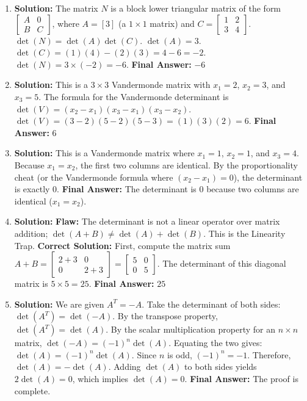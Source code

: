 \documentclass[11pt]{article}
\begin{document}
\begin{enumerate}
    \item \textbf{Solution:} The matrix $N$ is a block lower triangular matrix of the form $\begin{bmatrix} A & 0 \\ B & C \end{bmatrix}$, where $A = [3]$ (a $1 \times 1$ matrix) and $C = \begin{bmatrix} 1 & 2 \\ 3 & 4 \end{bmatrix}$.
    $\det(N) = \det(A)\det(C)$.
    $\det(A) = 3$.
    $\det(C) = (1)(4) - (2)(3) = 4 - 6 = -2$.
    $\det(N) = 3 \times (-2) = -6$.
    \textbf{Final Answer:} $-6$

    \item \textbf{Solution:} This is a $3 \times 3$ Vandermonde matrix with $x_1 = 2$, $x_2 = 3$, and $x_3 = 5$.
    The formula for the Vandermonde determinant is $\det(V) = (x_2 - x_1)(x_3 - x_1)(x_3 - x_2)$.
    $\det(V) = (3 - 2)(5 - 2)(5 - 3) = (1)(3)(2) = 6$.
    \textbf{Final Answer:} $6$

    \item \textbf{Solution:} This is a Vandermonde matrix where $x_1 = 1$, $x_2 = 1$, and $x_3 = 4$.
    Because $x_1 = x_2$, the first two columns are identical. By the proportionality cheat (or the Vandermonde formula where $(x_2 - x_1) = 0$), the determinant is exactly $0$.
    \textbf{Final Answer:} The determinant is $0$ because two columns are identical ($x_1 = x_2$).

    \item \textbf{Solution:} \textbf{Flaw:} The determinant is not a linear operator over matrix addition; $\det(A+B) \neq \det(A) + \det(B)$. This is the Linearity Trap.
    \textbf{Correct Solution:} First, compute the matrix sum $A+B = \begin{bmatrix} 2+3 & 0 \\ 0 & 2+3 \end{bmatrix} = \begin{bmatrix} 5 & 0 \\ 0 & 5 \end{bmatrix}$.
    The determinant of this diagonal matrix is $5 \times 5 = 25$.
    \textbf{Final Answer:} $25$

    \item \textbf{Solution:} We are given $A^T = -A$. Take the determinant of both sides:
    $\det(A^T) = \det(-A)$.
    By the transpose property, $\det(A^T) = \det(A)$.
    By the scalar multiplication property for an $n \times n$ matrix, $\det(-A) = (-1)^n \det(A)$.
    Equating the two gives: $\det(A) = (-1)^n \det(A)$.
    Since $n$ is odd, $(-1)^n = -1$.
    Therefore, $\det(A) = -\det(A)$.
    Adding $\det(A)$ to both sides yields $2\det(A) = 0$, which implies $\det(A) = 0$.
    \textbf{Final Answer:} The proof is complete.


\end{enumerate}
\end{document}
